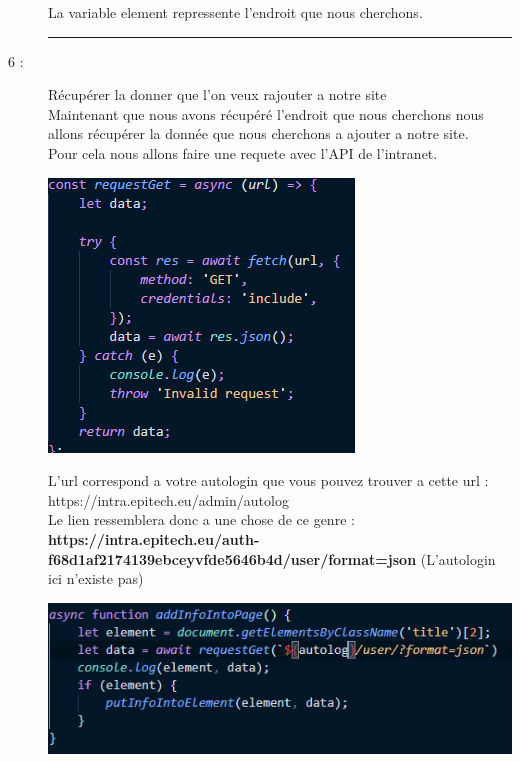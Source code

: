 \documentclass{article}
\begin{document}
\begin{description}
\begin{center}
        \end{center}
        La variable element repressente l'endroit que nous cherchons.
        \begin{center}
            \rule{0.75\linewidth}{1pt}
        \end{center}
        \item[6 :]{Récupérer la donner que l'on veux rajouter a notre site} \\ Maintenant que nous avons récupéré l'endroit que nous cherchons nous allons récupérer la donnée que nous cherchons a ajouter a notre site.
        \\ Pour cela nous allons faire une requete avec l'API de l'intranet.
        \begin{center}
            \includegraphics[scale=0.9]{requestGetSansLib.PNG}
        \end{center}
        L'url correspond a votre autologin que vous pouvez trouver a cette url : https://intra.epitech.eu/admin/autolog
        \\ Le lien ressemblera donc a une chose de ce genre : \\ \textbf{https://intra.epitech.eu/auth-f68d1af2174139ebceyvfde5646b4d/user/format=json} (L'autologin ici n'existe pas)
        \begin{center}
            \includegraphics[scale=0.8]{indexjsdeuxiemepartie.PNG}
        \end{center}

\end{description}
\end{document}
